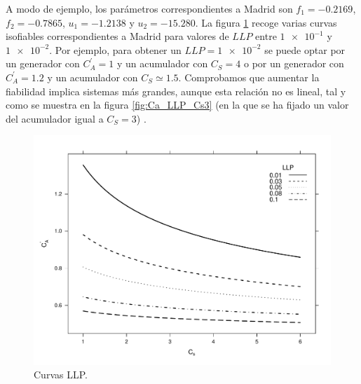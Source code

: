 A modo de ejemplo, los parámetros correspondientes a Madrid son $f_1=-0.2169$, $f_2=-0.7865$,
$u_1=-1.2138$ y $u_2=-15.280$. La figura \ref{fig:Curvas-LLP} recoge 
varias curvas isofiables correspondientes
a Madrid para valores de $LLP$ entre $\num{1e-1}$ y $\num{1e-2}$.
Por ejemplo, para obtener un $LLP=\num{1e-2}$ se puede optar por
un generador con $C_{A}^{'}=1$ y un acumulador con $C_{S}=4$ o por
un generador con $C_{A}^{'}=1.2$ y un acumulador con $C_{S}\simeq1.5$.
Comprobamos que aumentar la fiabilidad implica sistemas más grandes,
aunque esta relación no es lineal, tal y como se muestra en la figura
\ref{fig:Ca_LLP_Cs3} (en la que se ha fijado un valor del acumulador
igual a $C_{S}=3$) . 

%
\begin{figure}
\includegraphics[scale=0.75]{../figs/CurvasLLP}

\caption{Curvas LLP.\label{fig:Curvas-LLP}}



\end{figure}


